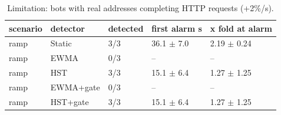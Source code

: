 \begin{table}[t]
\centering\small
\caption{Limitation: bots with real addresses completing HTTP requests (+2\%/s).}\label{tab:completing}
\begin{tabular}{lllll}
\toprule
scenario & detector & detected & first alarm s & x fold at alarm \\
\midrule
ramp & Static & 3/3 & 36.1 $\pm$ 7.0 & 2.19 $\pm$ 0.24 \\
ramp & EWMA & 0/3 & -- & -- \\
ramp & HST & 3/3 & 15.1 $\pm$ 6.4 & 1.27 $\pm$ 1.25 \\
ramp & EWMA+gate & 0/3 & -- & -- \\
ramp & HST+gate & 3/3 & 15.1 $\pm$ 6.4 & 1.27 $\pm$ 1.25 \\
\bottomrule
\end{tabular}
\end{table}
